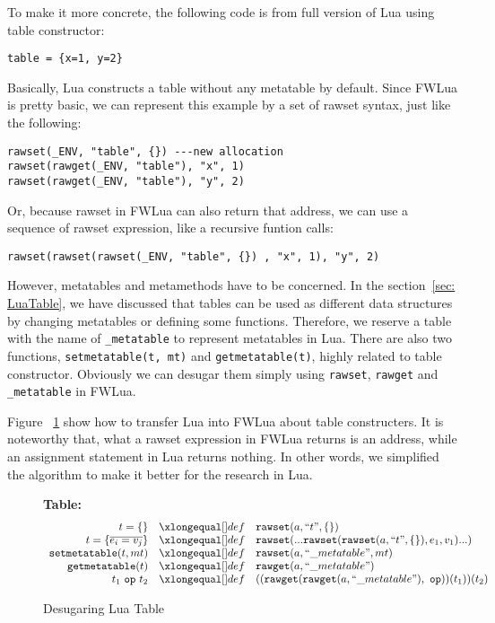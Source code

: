 To make it more concrete, the following code is from full version of Lua using table constructor:

\begin{verbatim}
table = {x=1, y=2}
\end{verbatim}

Basically, Lua constructs a table without any metatable by default. Since FWLua is pretty basic, we can represent this example by a set of rawset syntax, just like the following:

\begin{verbatim}
rawset(_ENV, "table", {}) ---new allocation
rawset(rawget(_ENV, "table"), "x", 1)
rawset(rawget(_ENV, "table"), "y", 2)
\end{verbatim}

Or, because rawset in FWLua can also return that address, we can use a sequence of rawset expression, like a recursive funtion calls:
\begin{verbatim}
rawset(rawset(rawset(_ENV, "table", {}) , "x", 1), "y", 2)
\end{verbatim}

However, metatables and metamethods have to be concerned. In the section~\ref{sec: LuaTable}, we have discussed that tables can be used as different data structures by changing metatables or defining some functions. Therefore, we reserve a table with the name of {\tt \_metatable} to represent metatables in Lua. There are also two functions, {\tt setmetatable(t, mt)} and {\tt getmetatable(t)}, highly related to table constructor. Obviously we can desugar them simply using {\tt rawset}, {\tt rawget} and {\tt \_metatable} in FWLua.

Figure ~\ref{fig:desLuaTable} show how to transfer Lua into FWLua about table constructers. It is noteworthy that, what a rawset expression in FWLua returns is an address, while an assignment statement in Lua returns nothing. In other words, we simplified the algorithm to make it better for the research in Lua.

\begin{figure}
\caption{Desugaring Lua Table}\label{fig:desLuaTable}
{\bf Table:}\[
\begin{array}{rclcl}
\desugar{t = \{\}}{{\tt rawset}(a,``t", \{\})}
\desugar{t = \{\overline{e_i = v_j}\}}{{\tt rawset}(...{\tt rawset}({\tt rawset}(a,``t", \{\}), e_1, v_1)...)}
\desugar{{\tt setmetatable}(t, mt)}{{\tt rawset}(a,``\_metatable", mt)}
\desugar{{\tt getmetatable}(t)}{{\tt rawget}(a,``\_metatable")}
\desugar{t_1~{\tt op}~t_2}{(({\tt rawget}({\tt rawget}(a,``\_metatable"),~{\tt op}))(t_1))(t_2)}
\end{array}\]
\end{figure}

